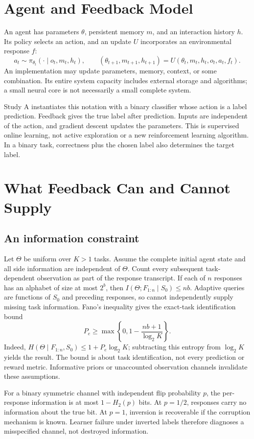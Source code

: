 \documentclass[11pt]{article}
\begin{document}
\section{Agent and Feedback Model}
An agent has parameters $\theta$, persistent memory $m$, and an interaction
history $h$. Its policy selects an action, and an update $U$ incorporates an
environmental response $f$:
\[
 a_t\sim\pi_{\theta_t}(\cdot\mid o_t,m_t,h_t),\qquad
 (\theta_{t+1},m_{t+1},h_{t+1})=U(\theta_t,m_t,h_t,o_t,a_t,f_t).
\]
An implementation may update parameters, memory, context, or some combination.
Its entire system capacity includes external storage and algorithms; a small
neural core is not necessarily a small complete system.

Study A instantiates this notation with a binary classifier whose action is a
label prediction. Feedback gives the true label after prediction. Inputs are
independent of the action, and gradient descent updates the parameters. This
is supervised online learning, not active exploration or a new reinforcement
learning algorithm. In a binary task, correctness plus the chosen label also
determines the target label.

\section{What Feedback Can and Cannot Supply}
\subsection{An information constraint}
Let $\Theta$ be uniform over $K>1$ tasks. Assume the complete initial agent
state and all side information are independent of $\Theta$. Count every
subsequent task-dependent observation as part of the response transcript.
If each of $n$ responses has an alphabet of size at most $2^b$, then
$I(\Theta;F_{1:n}\mid S_0)\leq nb$. Adaptive queries are functions of
$S_0$ and preceding responses, so cannot independently supply missing task
information. Fano's inequality gives the exact-task identification bound
\[
 P_e\geq \max\left\{0,1-\frac{nb+1}{\log_2 K}\right\}.
\]
Indeed, $H(\Theta\mid F_{1:n},S_0)\leq 1+P_e\log_2 K$; subtracting
this entropy from $\log_2 K$ yields the result. The bound is about task
identification, not every prediction or reward metric. Informative priors or
unaccounted observation channels invalidate these assumptions.

For a binary symmetric channel with independent flip probability $p$, the
per-response information is at most $1-H_2(p)$ bits. At $p=1/2$, responses
carry no information about the true bit. At $p=1$, inversion is recoverable
if the corruption mechanism is known. Learner failure under inverted labels
therefore diagnoses a misspecified channel, not destroyed information.
\end{document}
